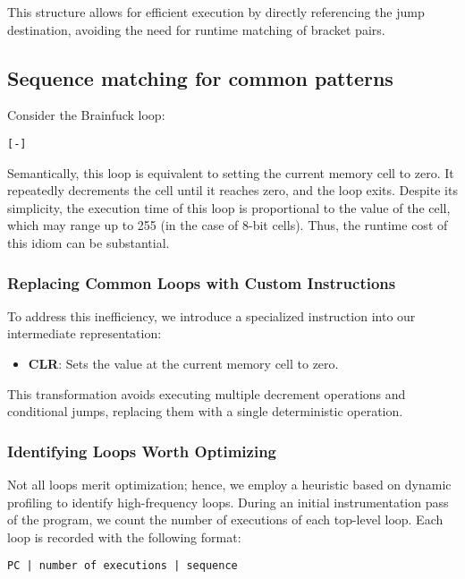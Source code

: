 This structure allows for efficient execution by directly referencing the jump destination, avoiding the need for runtime matching of bracket pairs.

\subsection{Sequence matching for common patterns}
\label{subsec:ch2sec3sec3}

\par Consider the Brainfuck loop:

\begin{verbatim}
[-]
\end{verbatim}

Semantically, this loop is equivalent to setting the current memory cell to zero. It repeatedly decrements the cell until it reaches zero, and the loop exits. Despite its simplicity, the execution time of this loop is proportional to the value of the cell, which may range up to 255 (in the case of 8-bit cells). Thus, the runtime cost of this idiom can be substantial.

\subsubsection*{Replacing Common Loops with Custom Instructions}

To address this inefficiency, we introduce a specialized instruction into our intermediate representation:

\begin{itemize}
    \item \textbf{CLR}: Sets the value at the current memory cell to zero.
\end{itemize}

This transformation avoids executing multiple decrement operations and conditional jumps, replacing them with a single deterministic operation.

\subsubsection*{Identifying Loops Worth Optimizing}

Not all loops merit optimization; hence, we employ a heuristic based on dynamic profiling to identify high-frequency loops. During an initial instrumentation pass of the program, we count the number of executions of each top-level loop. Each loop is recorded with the following format:

\begin{verbatim}
PC | number of executions | sequence
\end{verbatim}

